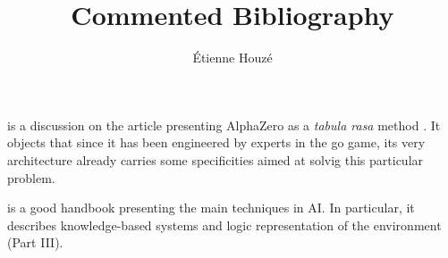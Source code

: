 \documentclass{article}
\title{Commented Bibliography}
\author{\'Etienne Houzé}
\date{}
\begin{document}
\maketitle
    \cite{marcus2018innateness} is a discussion on the article presenting AlphaZero as a \emph{tabula rasa} method \cite{silver2017mastering}. It objects that since it has been engineered by experts in the go game, its very architecture already carries some specificities aimed at solvig this particular problem.

    \cite{russell2016artificial} is a good handbook presenting the main techniques in AI. In particular, it describes knowledge-based systems and logic representation of the environment (Part III).




\end{document}

